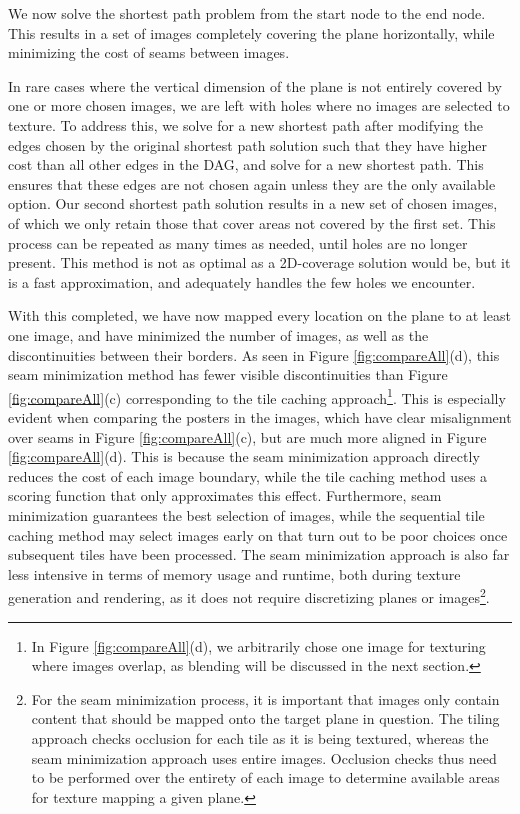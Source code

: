 \documentclass[10pt,twocolumn,letterpaper]{article}
\begin{document}
We now solve the shortest path problem from the start node to the end
node. This results in a set of images completely covering the plane
horizontally, while minimizing the cost of seams between images.

In rare cases where the vertical dimension of the plane is not
entirely covered by one or more chosen images, we are left with holes
where no images are selected to texture. To address this, we solve for
a new shortest path after modifying the edges chosen by the original
shortest path solution such that they have higher cost than all other
edges in the DAG, and solve for a new shortest path. This ensures that
these edges are not chosen again unless they are the only available
option. Our second shortest path solution results in a new set of
chosen images, of which we only retain those that cover areas not
covered by the first set. This process can be repeated as many times
as needed, until holes are no longer present. This method is not as
optimal as a 2D-coverage solution would be, but it is a fast
approximation, and adequately handles the few holes we encounter.

With this completed, we have now mapped every location on the plane to
at least one image, and have minimized the number of images, as well
as the discontinuities between their borders. As seen in Figure
\ref{fig:compareAll}(d), this seam minimization method has fewer
visible discontinuities than Figure \ref{fig:compareAll}(c)
corresponding to the tile caching approach\footnote{In Figure
  \ref{fig:compareAll}(d), we arbitrarily chose one image for
  texturing where images overlap, as blending will be discussed in the
  next section.}. This is especially evident when comparing the
posters in the images, which have clear misalignment over seams in
Figure \ref{fig:compareAll}(c), but are much more aligned in Figure
\ref{fig:compareAll}(d). This is because the seam minimization
approach directly reduces the cost of each image boundary, while the
tile caching method uses a scoring function that only approximates
this effect. Furthermore, seam minimization guarantees the best
selection of images, while the sequential tile caching method may
select images early on that turn out to be poor choices once
subsequent tiles have been processed. The seam minimization approach
is also far less intensive in terms of memory usage and runtime, both
during texture generation and rendering, as it does not require
discretizing planes or images\footnote{ For the seam minimization
  process, it is important that images only contain content that
  should be mapped onto the target plane in question. The tiling
  approach checks occlusion for each tile as it is being textured,
  whereas the seam minimization approach uses entire images.
  Occlusion checks thus need to be performed over the entirety of each
  image to determine available areas for texture mapping a given
  plane.  }.
\end{document}
